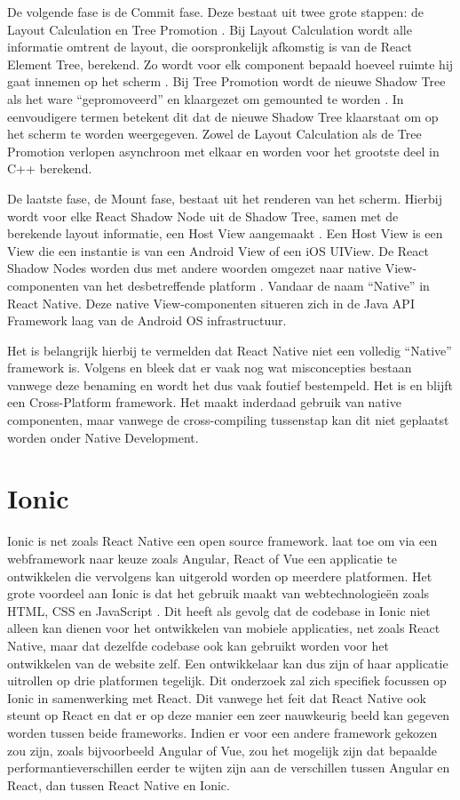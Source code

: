 De volgende fase is de Commit fase. Deze bestaat uit twee grote stappen: de Layout Calculation en Tree Promotion \autocite{Bron15}. Bij Layout Calculation wordt alle informatie omtrent de layout, die oorspronkelijk afkomstig is van de React Element Tree, berekend. Zo wordt voor elk component bepaald hoeveel ruimte hij gaat innemen op het scherm \autocite{Bron15}. Bij Tree Promotion wordt de nieuwe Shadow Tree als het ware ``gepromoveerd'' en klaargezet om gemounted te worden \autocite{Bron15}. In eenvoudigere termen betekent dit dat de nieuwe Shadow Tree klaarstaat om op het scherm te worden weergegeven. Zowel de Layout Calculation als de Tree Promotion verlopen asynchroon met elkaar en worden voor het grootste deel in C++ berekend.

De laatste fase, de Mount fase, bestaat uit het renderen van het scherm. Hierbij wordt voor elke React Shadow Node uit de Shadow Tree, samen met de berekende layout informatie, een Host View aangemaakt \autocite{Bron15}. Een Host View is een View die een instantie is van een Android View of een iOS UIView. De React Shadow Nodes worden dus met andere woorden omgezet naar native View-componenten van het desbetreffende platform \autocite{Bron15}. Vandaar de naam ``Native'' in React Native. Deze native View-componenten situeren zich in de Java API Framework laag van de Android OS infrastructuur.

Het is belangrijk hierbij te vermelden dat React Native niet een volledig ``Native'' framework is. Volgens \autocite{Bron3} en \autocite{Bron2} bleek dat er vaak nog wat misconcepties bestaan vanwege deze benaming en wordt het dus vaak foutief bestempeld. Het is en blijft een Cross-Platform framework. Het maakt inderdaad gebruik van native componenten, maar vanwege de cross-compiling tussenstap kan dit niet geplaatst worden onder Native Development.

\section{Ionic}
\label{sec:ionic}

Ionic is net zoals React Native een open source framework. \textcite{Bron8} laat toe om via een webframework naar keuze zoals Angular, React of Vue een applicatie te ontwikkelen die vervolgens kan uitgerold worden op meerdere platformen. Het grote voordeel aan Ionic is dat het gebruik maakt van webtechnologieën zoals HTML, CSS en JavaScript \autocite{Bron8}. Dit heeft als gevolg dat de codebase in Ionic niet alleen kan dienen voor het ontwikkelen van mobiele applicaties, net zoals React Native, maar dat dezelfde codebase ook kan gebruikt worden voor het ontwikkelen van de website zelf. Een ontwikkelaar kan dus zijn of haar applicatie uitrollen op drie platformen tegelijk. Dit onderzoek zal zich specifiek focussen op Ionic in samenwerking met React. Dit vanwege het feit dat React Native ook steunt op React en dat er op deze manier een zeer nauwkeurig beeld kan gegeven worden tussen beide frameworks. Indien er voor een andere framework gekozen zou zijn, zoals bijvoorbeeld Angular of Vue, zou het mogelijk zijn dat bepaalde performantieverschillen eerder te wijten zijn aan de verschillen tussen Angular en React, dan tussen React Native en Ionic.

